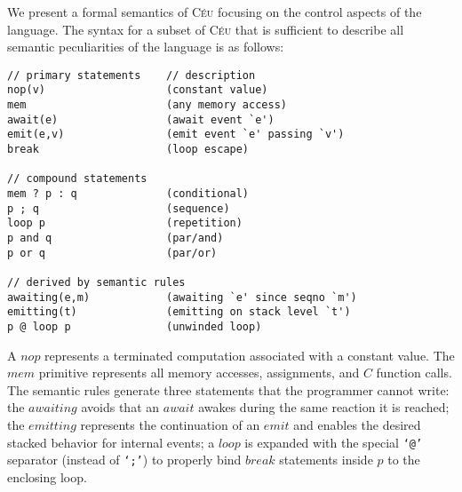 \documentclass{acm_proc_article-sp}
\newcommand{\CEU}{\textsc{C\'{e}u}\xspace}
\newcommand{\code}[1] {{\small{\texttt{#1}}}}
\newcommand{\1}{\;}
\newcommand{\2}{\;\;}
\newcommand{\3}{\;\;\;}
\newcommand{\5}{\;\;\;\;\;}
\begin{document}
We present a formal semantics of \CEU focusing on the control aspects of the 
language.
%
%
The syntax for a subset of \CEU that is sufficient to describe all semantic 
peculiarities of the language is as follows:
%
{\small
\begin{verbatim}
// primary statements    // description
nop(v)                   (constant value)
mem                      (any memory access)
await(e)                 (await event `e')
emit(e,v)                (emit event `e' passing `v')
break                    (loop escape)

// compound statements
mem ? p : q              (conditional)
p ; q                    (sequence)
loop p                   (repetition)
p and q                  (par/and)
p or q                   (par/or)

// derived by semantic rules
awaiting(e,m)            (awaiting `e' since seqno `m')
emitting(t)              (emitting on stack level `t')
p @ loop p               (unwinded loop)
\end{verbatim}
}%
%
A $nop$ represents a terminated computation associated with a constant value.
The $mem$ primitive represents all memory accesses, assignments, and $C$ 
function calls.
%
%
The semantic rules generate three statements that the programmer cannot write:
the $awaiting$ avoids that an $await$ awakes during the same reaction it is 
reached;
the $emitting$ represents the continuation of an $emit$ and enables the desired 
stacked behavior for internal events;
a $loop$ is expanded with the special \code{`@'} separator (instead of 
\code{`;'}) to properly bind $break$ statements inside $p$ to the enclosing 
loop.

\end{document}
